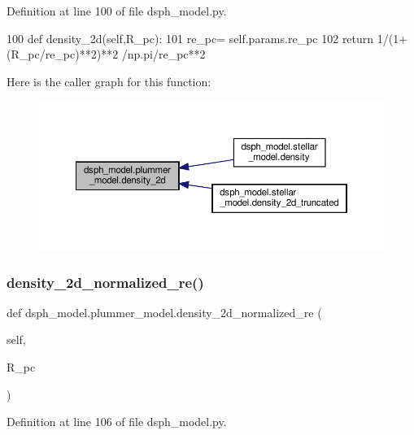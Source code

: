 Definition at line 100 of file dsph\+\_\+model.\+py.


\begin{DoxyCode}
100     \textcolor{keyword}{def }density\_2d(self,R\_pc):
101         re\_pc= self.params.re\_pc
102         \textcolor{keywordflow}{return} 1/(1+(R\_pc/re\_pc)**2)**2 /np.pi/re\_pc**2
\end{DoxyCode}
Here is the caller graph for this function\+:\nopagebreak
\begin{figure}[H]
\begin{center}
\leavevmode
\includegraphics[width=350pt]{d4/d46/classdsph__model_1_1plummer__model_af63912fdaa4af84219a46210ffd8ab92_icgraph}
\end{center}
\end{figure}
\mbox{\label{classdsph__model_1_1plummer__model_a73d9b4b17be695ccf81f2259c06e9aa4}} 
\subsubsection{\texorpdfstring{density\+\_\+2d\+\_\+normalized\+\_\+re()}{density\_2d\_normalized\_re()}}
{\footnotesize\ttfamily def dsph\+\_\+model.\+plummer\+\_\+model.\+density\+\_\+2d\+\_\+normalized\+\_\+re (\begin{DoxyParamCaption}\item[{}]{self,  }\item[{}]{R\+\_\+pc }\end{DoxyParamCaption})}



Definition at line 106 of file dsph\+\_\+model.\+py.


